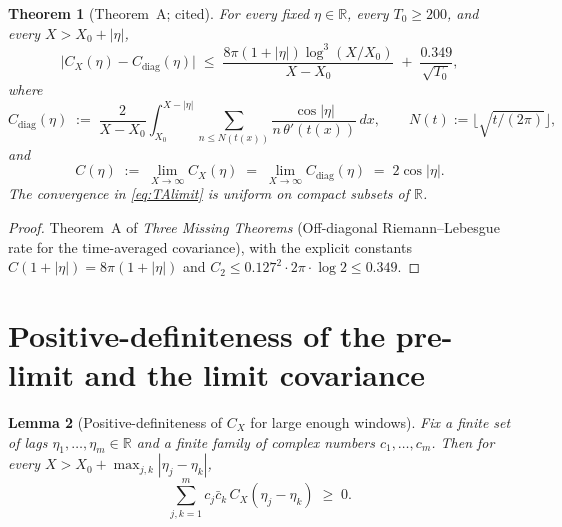 \documentclass[11pt]{article}
\newtheorem{theorem}{Theorem}
\newtheorem{lemma}[theorem]{Lemma}
\theoremstyle{definition}
\theoremstyle{remark}
\begin{document}
\begin{theorem}[Theorem~A; cited]\label{thm:A}
For every fixed $\eta\in\mathbb{R}$, every $T_0\ge 200$, and every $X>X_0+|\eta|$,
\begin{equation}\label{eq:TA}
  \bigl|C_X(\eta)-C_{\mathrm{diag}}(\eta)\bigr|\;\le\;\frac{8\pi(1+|\eta|)\log^3(X/X_0)}{X-X_0}\;+\;\frac{0.349}{\sqrt{T_0}},
\end{equation}
where
\begin{equation}\label{eq:Cdiag}
  C_{\mathrm{diag}}(\eta)\;:=\;\frac{2}{X-X_0}\int_{X_0}^{X-|\eta|}\sum_{n\le N(t(x))}\frac{\cos|\eta|}{n\,\theta'(t(x))}\,dx,\qquad N(t):=\lfloor\sqrt{t/(2\pi)}\rfloor,
\end{equation}
and
\begin{equation}\label{eq:TAlimit}
  C(\eta)\;:=\;\lim_{X\to\infty}C_X(\eta)\;=\;\lim_{X\to\infty}C_{\mathrm{diag}}(\eta)\;=\;2\cos|\eta|.
\end{equation}
The convergence in \eqref{eq:TAlimit} is uniform on compact subsets of $\mathbb{R}$.
\end{theorem}

\begin{proof}
Theorem~A of \emph{Three Missing Theorems} (Off-diagonal Riemann--Lebesgue rate for the time-averaged covariance), with the explicit constants $C(1+|\eta|)=8\pi(1+|\eta|)$ and $C_2\le 0.127^2\cdot 2\pi\cdot\log 2\le 0.349$.
\end{proof}

\section{Positive-definiteness of the pre-limit and the limit covariance}

\begin{lemma}[Positive-definiteness of $C_X$ for large enough windows]\label{lem:pdCX}
Fix a finite set of lags $\eta_1,\dots,\eta_m\in\mathbb{R}$ and a finite family of complex numbers $c_1,\dots,c_m$. Then for every $X>X_0+\max_{j,k}|\eta_j-\eta_k|$,
\begin{equation}\label{eq:pdX}
  \sum_{j,k=1}^m c_j\bar c_k\,C_X(\eta_j-\eta_k)\;\ge\;0.
\end{equation}
\end{lemma}
\end{document}

